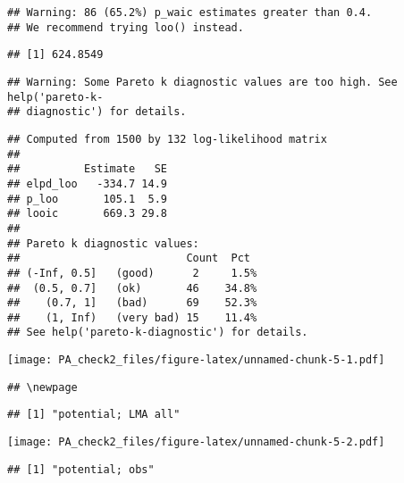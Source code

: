 \documentclass[12pt,]{article}
\begin{document}
\begin{verbatim}
## Warning: 86 (65.2%) p_waic estimates greater than 0.4.
## We recommend trying loo() instead.
\end{verbatim}

\begin{verbatim}
## [1] 624.8549
\end{verbatim}

\begin{verbatim}
## Warning: Some Pareto k diagnostic values are too high. See help('pareto-k-
## diagnostic') for details.
\end{verbatim}

\begin{verbatim}
## Computed from 1500 by 132 log-likelihood matrix
## 
##          Estimate   SE
## elpd_loo   -334.7 14.9
## p_loo       105.1  5.9
## looic       669.3 29.8
## 
## Pareto k diagnostic values:
##                          Count  Pct 
## (-Inf, 0.5]   (good)      2     1.5%
##  (0.5, 0.7]   (ok)       46    34.8%
##    (0.7, 1]   (bad)      69    52.3%
##    (1, Inf)   (very bad) 15    11.4%
## See help('pareto-k-diagnostic') for details.
\end{verbatim}

\texttt{[image: PA\_check2\_files/figure-latex/unnamed-chunk-5-1.pdf]}

\begin{verbatim}
## \newpage
\end{verbatim}

\begin{verbatim}
## [1] "potential; LMA all"
\end{verbatim}

\texttt{[image: PA\_check2\_files/figure-latex/unnamed-chunk-5-2.pdf]}

\begin{verbatim}
## [1] "potential; obs"
\end{verbatim}
\end{document}
